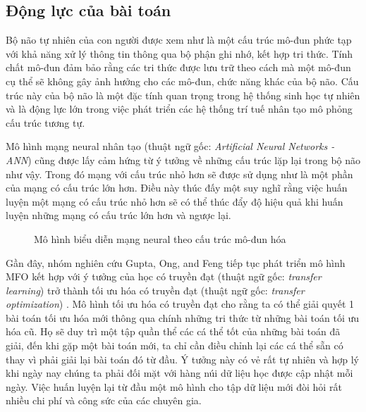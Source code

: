 \subsection{Động lực của bài toán}
Bộ não tự nhiên của con người được xem như là một cấu trúc mô-đun phức tạp với khả năng xử lý thông tin thông qua bộ phận ghi nhớ, kết hợp tri thức. Tính chất mô-đun đảm bảo rằng các tri thức được lưu trữ theo cách mà một mô-đun cụ thể sẽ không gây ảnh hưởng cho các mô-đun, chức năng khác của bộ não. Cấu trúc này của bộ não là một đặc tính quan trọng trong hệ thống sinh học tự nhiên và là động lực lớn trong việc phát triển các hệ thống trí tuế nhân tạo mô phỏng cấu trúc tương tự.

Mô hình mạng neural nhân tạo (thuật ngữ gốc: \emph{Artificial Neural Networks - ANN}) cũng được lấy cảm hứng từ ý tưởng về những cấu trúc lặp lại trong bộ não như vậy. Trong đó mạng với cấu trúc nhỏ hơn sẽ được sử dụng như là một phần của mạng có cấu trúc lớn hơn. Điều này thúc đấy một suy nghĩ rằng việc huấn luyện một mạng có cấu trúc nhỏ hơn sẽ có thể thúc đẩy độ hiệu quả khi huấn luyện những mạng có cấu trúc lớn hơn và ngược lại.
\begin{figure}[ht]
    \centering
    \caption{Mô hình biểu diễn mạng neural theo cấu trúc mô-đun hóa}
    \label{fig:problem:modular}
\end{figure}

Gần đây, nhóm nghiên cứu Gupta, Ong, and Feng tiếp tục phát triển mô hình MFO kết hợp với ý
tưởng của học có truyền đạt (thuật ngữ gốc: \emph{transfer learning}) \cite{pan2009survey} trở thành tối ưu hóa có truyền đạt (thuật ngữ gốc: \emph{transfer optimization}) \cite{gupta2017insights}. Mô hình tối ưu hóa có truyền đạt cho rằng ta có thể giải quyết 1 bài toán tối ưu hóa mới thông qua chính những tri thức từ những bài toán tối ưu hóa cũ. Họ sẽ duy trì một tập quần thể các cá thể tốt của những bài toán đã giải, đến khi gặp một bài toán mới, ta chỉ cần điều chỉnh lại các cá thể sẵn có thay vì phải giải lại bài toán đó từ đầu. Ý tưởng này có vẻ rất tự nhiên và hợp lý khi ngày nay chúng ta phải đối mặt với hàng núi dữ liệu học được cập nhật mỗi ngày. Việc huấn luyện lại từ đầu một mô hình cho tập dữ liệu mới đòi hỏi rất nhiều chi phí và công sức của các chuyên gia.

